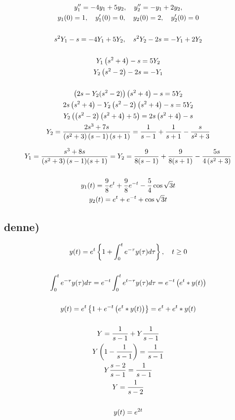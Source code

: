\begin{gather*}
	y_1'' = - 4 y_1 + 5 y_2, \quad
	y_2'' = - y_1 + 2 y_2,
	\\
	y_1(0) = 1, \quad
	y_1'(0) = 0, \quad
	y_2(0) = 2, \quad
	y_2'(0) = 0
	\\ \\
	s^2 Y_1 - s = - 4 Y_1 + 5 Y_2, \quad
	s^2 Y_2 - 2 s = - Y_1 + 2 Y_2
	\\ \\
	Y_1 \left( s^2 + 4 \right) - s = 5 Y_2
	\\
	Y_2 \left( s^2 - 2 \right) - 2 s = - Y_1
	\\ \\
	\left( 2 s - Y_2 (s^2 - 2) \right) \left( s^2 + 4 \right) - s = 5 Y_2 \\
	2s \left( s^2 + 4 \right) - Y_2 \left( s^2 - 2 \right) \left( s^2 + 4 \right) - s = 5 Y_2
	\\
	Y_2 \left( \left( s^2 - 2 \right) \left( s^2 + 4 \right) + 5 \right) = 2 s \left( s^2 + 4 \right) - s \\
	Y_2 = \frac{2 s^3 + 7 s}{\left( s^2 + 3 \right) \left( s - 1 \right) \left( s + 1 \right)} =
	\frac{1}{s - 1} + \frac{1}{s + 1} - \frac{s}{s^2 + 3} \\
\end{gather*}

\newpage

\begin{gather*}
	Y_1 = \frac{s^3 + 8 s}{\left( s^2 + 3 \right) (s- 1) (s + 1)} =
	Y_2 = \frac{9}{8(s - 1)} + \frac{9}{8(s + 1)} - \frac{5 s}{4 \left( s^2 + 3 \right)}
	\\ \\
	y_1(t) = \frac{9}{8} e^{t} + \frac{9}{8} e^{-t} - \frac{5}{4} \cos{\sqrt{3} t}
	\\
	y_2(t) = e^t + e^{-t} + \cos{\sqrt{3} t}
\end{gather*}



\subsection*{denne)}


\begin{gather*}
	y(t) = e^t \left\{1 + \int_0^t{e^{-\tau} y(\tau) d\tau}\right\}, \quad
	t \geq 0
	\\ \\
	\int_0^t{e^{-\tau} y(\tau) d\tau} = e^{-t} \int_0^t{e^{t-\tau} y(\tau) d\tau} =
	e^{-t} \left( e^t * y(t) \right)
	\\ \\
	y(t) = e^t \left\{1 + e^{-t} \left( e^t * y(t) \right)\right\} =
	e^t + e^t * y(t)
	\\ \\
	Y = \frac{1}{s - 1} + Y \frac{1}{s - 1}
	\\
	Y \left( 1 - \frac{1}{s - 1} \right) = \frac{1}{s - 1}
	\\
	Y \frac{s - 2}{s - 1} = \frac{1}{s - 1}
	\\
	Y = \frac{1}{s - 2}
	\\ \\
	y(t) = e^{2 t}
\end{gather*}
